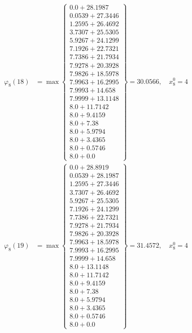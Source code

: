 \documentclass{article}
\begin{document}
\begin{align*}
\varphi_{8}(18) &= \max \left\{ \begin{array}{c}
0.0 + 28.1987 \\
 0.0539 + 27.3446 \\
 1.2595 + 26.4692 \\
 3.7307 + 25.5305 \\
 5.9267 + 24.1299 \\
 7.1926 + 22.7321 \\
 7.7386 + 21.7934 \\
 7.9278 + 20.3928 \\
 7.9826 + 18.5978 \\
 7.9963 + 16.2995 \\
 7.9993 + 14.658 \\
 7.9999 + 13.1148 \\
 8.0 + 11.7142 \\
 8.0 + 9.4159 \\
 8.0 + 7.38 \\
 8.0 + 5.9794 \\
 8.0 + 3.4365 \\
 8.0 + 0.5746 \\
 8.0 + 0.0
\end{array} \right\}=30.0566, \quad x_{8}^0=4\\
  
\varphi_{8}(19) &= \max \left\{ \begin{array}{c}
0.0 + 28.8919 \\
 0.0539 + 28.1987 \\
 1.2595 + 27.3446 \\
 3.7307 + 26.4692 \\
 5.9267 + 25.5305 \\
 7.1926 + 24.1299 \\
 7.7386 + 22.7321 \\
 7.9278 + 21.7934 \\
 7.9826 + 20.3928 \\
 7.9963 + 18.5978 \\
 7.9993 + 16.2995 \\
 7.9999 + 14.658 \\
 8.0 + 13.1148 \\
 8.0 + 11.7142 \\
 8.0 + 9.4159 \\
 8.0 + 7.38 \\
 8.0 + 5.9794 \\
 8.0 + 3.4365 \\
 8.0 + 0.5746 \\
 8.0 + 0.0
\end{array} \right\}=31.4572, \quad x_{8}^0=4\\
  

\end{align*}
\end{document}
